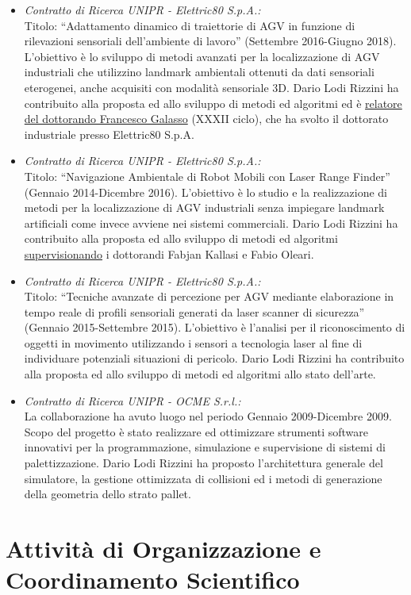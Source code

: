 \documentclass[11pt]{article}
\newcommand{\ITEMDATE}[1]{\item \textit{#1:}\\}
\begin{document}
\begin{itemize}
\ITEMDATE{Contratto di Ricerca UNIPR - Elettric80 S.p.A.} 
Titolo: ``Adattamento dinamico di traiettorie di AGV in funzione di rilevazioni sensoriali dell'ambiente di lavoro'' (Settembre 2016-Giugno 2018). 
L'obiettivo \`e lo sviluppo di metodi avanzati per la localizzazione di AGV industriali 
che utilizzino landmark ambientali ottenuti da dati sensoriali eterogenei, anche acquisiti con modalit\`a sensoriale 3D. 
Dario Lodi Rizzini ha contribuito alla proposta ed allo sviluppo di metodi ed algoritmi 
ed \`e \ul{relatore del dottorando Francesco Galasso} (XXXII ciclo), che ha svolto il dottorato industriale presso Elettric80 S.p.A.

\ITEMDATE{Contratto di Ricerca UNIPR - Elettric80 S.p.A.} 
Titolo: ``Navigazione Ambientale di Robot Mobili con Laser Range Finder'' (Gennaio 2014-Dicembre 2016). 
L'obiettivo \`e lo studio e la realizzazione di metodi per la localizzazione di AGV industriali 
senza impiegare landmark artificiali come invece avviene nei sistemi commerciali.
Dario Lodi Rizzini ha contribuito alla proposta ed allo sviluppo di metodi ed algoritmi 
\ul{supervisionando} i dottorandi Fabjan Kallasi e Fabio Oleari.

\ITEMDATE{Contratto di Ricerca UNIPR - Elettric80 S.p.A.} 
Titolo: ``Tecniche avanzate di percezione per AGV mediante elaborazione in tempo reale di profili sensoriali generati da laser scanner di sicurezza'' (Gennaio 2015-Settembre 2015). 
L'obiettivo \`e l'analisi per il riconoscimento di oggetti in movimento utilizzando 
i sensori a tecnologia laser al fine di individuare potenziali situazioni di pericolo.
Dario Lodi Rizzini ha contribuito alla proposta ed allo sviluppo di metodi ed algoritmi 
allo stato dell'arte.

\ITEMDATE{Contratto di Ricerca UNIPR - OCME S.r.l.}
La collaborazione ha avuto luogo nel periodo Gennaio 2009-Dicembre 2009. 
Scopo del progetto \`e stato realizzare ed ottimizzare strumenti software innovativi per 
la programmazione, simulazione e supervisione di sistemi di palettizzazione.
Dario Lodi Rizzini ha proposto l'architettura generale del simulatore, la gestione 
ottimizzata di collisioni ed i metodi di generazione della geometria dello strato pallet.

\end{itemize}


\section*{Attivit\`a di Organizzazione e Coordinamento Scientifico}
\end{document}
